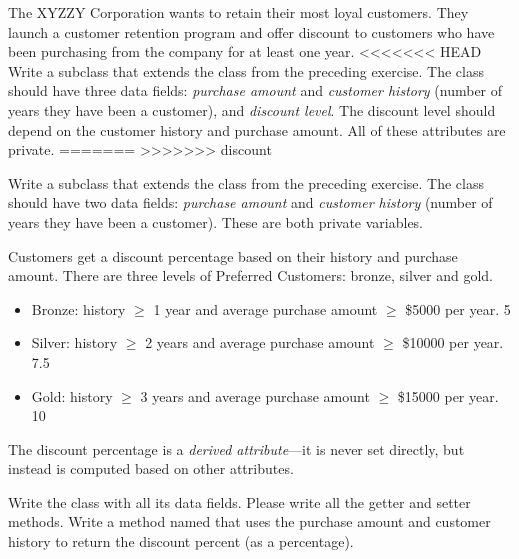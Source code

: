 \begin{exercise}
The XYZZY Corporation wants to retain their most loyal customers. They launch a customer retention program and offer discount to customers who have been purchasing from the company for at least one year.
<<<<<<< HEAD
Write a subclass  that extends the  class from the preceding exercise. The  class should have three data fields: {\em purchase amount} and {\em customer history} (number of years they have been a customer), and {\em discount level}. The discount level should depend on the customer history and purchase amount. All of these attributes are private.
=======
>>>>>>> discount

Write a subclass  that extends the  class from the preceding exercise. The  class should have two data fields: {\em purchase amount} and {\em customer history} (number of years they have been a customer). These are both private variables.

Customers get a discount percentage based on their history and purchase amount. There are three levels of Preferred Customers: bronze, silver and gold.

\begin{itemize}
\item Bronze: history $\geq$ 1 year and average purchase amount $\geq$ \$5000 per year.  5%
\item Silver:  history $\geq$ 2 years and average purchase amount $\geq$ \$10000 per year. 7.5%
\item Gold:  history $\geq$ 3 years and average purchase amount $\geq$ \$15000 per year. 10%
\end{itemize}

The discount percentage is a {\em derived attribute}---it is never set directly, but instead is computed based on other attributes.

Write the  class with all its data fields. Please write all the getter and setter methods.  Write a method named  that uses the purchase amount and customer history to return the discount percent (as a percentage).
\end{exercise}


